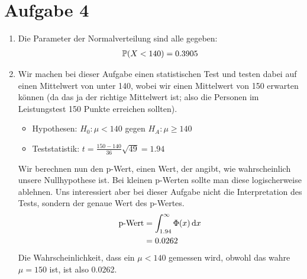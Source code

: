 \documentclass{article}
\renewcommand{\P}{\mathbb{P}}
\begin{document}
	\section*{Aufgabe 4}
	\begin{enumerate}[label=(\alph*)]
		\item Die Parameter der Normalverteilung sind alle gegeben:
		\begin{align}
			\P(X < 140) = 0.3905 \notag
		\end{align}
		\item Wir machen bei dieser Aufgabe einen statistischen Test und testen dabei auf einen Mittelwert von unter 140, wobei wir einen Mittelwert von 150 erwarten können (da das ja der richtige Mittelwert ist; also die Personen im Leistungstest 150 Punkte erreichen sollten).
		\begin{itemize}
			\item Hypothesen: $H_0: \mu < 140$ gegen $H_A:\mu \ge 140$
			\item Teststatistik: $t=\frac{150-140}{36}\sqrt{49} = 1.94$
		\end{itemize}
		Wir berechnen nun den p-Wert, einen Wert, der angibt, wie wahrscheinlich unsere Nullhypothese ist. Bei kleinen p-Werten sollte man diese logischerweise ablehnen. Uns interessiert aber bei dieser Aufgabe nicht die Interpretation des Tests, sondern der genaue Wert des p-Wertes.
		\begin{align}
			\text{p-Wert} &= \int_{1.94}^{\infty} \Phi(x)\,\mathrm{d}x \notag \\
			&= 0.0262 \notag
		\end{align}
		Die Wahrscheinlichkeit, dass ein $\mu < 140$ gemessen wird, obwohl das wahre $\mu = 150$ ist, ist also 0.0262.
	\end{enumerate}
	
\end{document}

